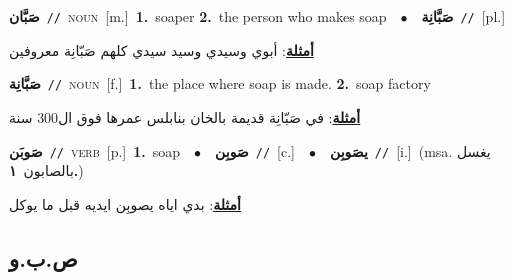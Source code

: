 \documentclass[10pt,a4paper,twoside]{article} %
\begin{document}
\begin{multicols}{2}
{\setlength\topsep{0pt}\textbf{\foreignlanguage{arabic}{صَبَّان}}\ {\color{gray}\texttt{//}\color{black}}\ \textsc{noun}\ [m.]\ \textbf{1.}~soaper  \textbf{2.}~the person who makes soap\ \ $\bullet$\ \ \setlength\topsep{0pt}\textbf{\foreignlanguage{arabic}{صَبَّانِة}}\ {\color{gray}\texttt{//}\color{black}}\ [pl.]\  \begin{flushright}\color{gray}\foreignlanguage{arabic}{\textbf{\underline{\foreignlanguage{arabic}{أمثلة}}}: أبوي وسيدي وسيد سيدي كلهم صَبّانِة معروفين}\end{flushright}\color{black}} \vspace{2mm}

{\setlength\topsep{0pt}\textbf{\foreignlanguage{arabic}{صَبَّانِة}}\ {\color{gray}\texttt{//}\color{black}}\ \textsc{noun}\ [f.]\ \textbf{1.}~the place where soap is made.  \textbf{2.}~soap factory\  \begin{flushright}\color{gray}\foreignlanguage{arabic}{\textbf{\underline{\foreignlanguage{arabic}{أمثلة}}}: في صَبّانِة قديمة بالخان بنابلس عمرها فوق ال300 سنة}\end{flushright}\color{black}} \vspace{2mm}

{\setlength\topsep{0pt}\textbf{\foreignlanguage{arabic}{صَوبَن}}\ {\color{gray}\texttt{//}\color{black}}\ \textsc{verb}\ [p.]\ \textbf{1.}~soap\ \ $\bullet$\ \ \setlength\topsep{0pt}\textbf{\foreignlanguage{arabic}{صَوبِن}}\ {\color{gray}\texttt{//}\color{black}}\ [c.]\ \ $\bullet$\ \ \setlength\topsep{0pt}\textbf{\foreignlanguage{arabic}{يصَوبِن}}\ {\color{gray}\texttt{//}\color{black}}\ [i.]\ \color{gray}(msa. \foreignlanguage{arabic}{يغسل بالصابون}~\foreignlanguage{arabic}{\textbf{١.}})\color{black}\  \begin{flushright}\color{gray}\foreignlanguage{arabic}{\textbf{\underline{\foreignlanguage{arabic}{أمثلة}}}: بدي اياه يصوبِن ايديه قبل ما يوكل}\end{flushright}\color{black}} \vspace{2mm}

\vspace{-3mm}
\subsection*{\color{blue}\foreignlanguage{arabic}{ص.ب.و}\color{blue}{}} 


\end{multicols}
\end{document}

